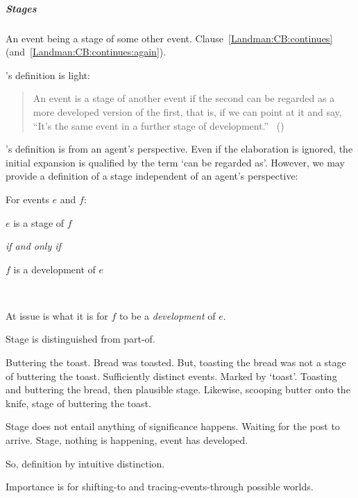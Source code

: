 \subparagraph{Stages}

\begin{note}
  An event being a stage of some other event.
  Clause~\ref{Landman:CB:continues} (and~\ref{Landman:CB:continues:again}).

  \citeauthor{Landman:1992wh}'s definition is light:
  \begin{quote}
    An event is a stage of another event if the second can be regarded as a more developed version of the first, that is, if we can point at it and say, ``It's the same event in a further stage of development.''\newline
    \mbox{ }\hfill\mbox{(\citeyear[23]{Landman:1992wh})}
  \end{quote}
  \citeauthor{Landman:1992wh}'s definition is from an agent's perspective.
  Even if the elaboration is ignored, the initial expansion is qualified by the term `can be regarded as'.
  However, we may provide a definition of a stage independent of an agent's perspective:
  \begin{definition}[Stage]
    For events \(e\) and \(f\):

    \begin{itemize*}
    \item
      \(e\) is a stage of \(f\)
    \item
      \emph{if and only if}
    \item
      \(f\) is a development of \(e\)
    \item
      \mbox{ }
    \end{itemize*}
  \end{definition}
  At issue is what it is for \(f\) to be a \emph{development} of \(e\).

  Stage is distinguished from part-of.
  \nocite{Davidson:1967aa}

  Buttering the toast.
  Bread was toasted.
  But, toasting the bread was not a stage of buttering the toast.
  Sufficiently distinct events.
  Marked by `toast'.
  Toasting and buttering the bread, then plausible stage.
  Likewise, scooping butter onto the knife, stage of buttering the toast.

  Stage does not entail anything of significance happens.
  Waiting for the post to arrive.
  Stage, nothing is happening, event has developed.

  So, definition by intuitive distinction.

  Importance is for shifting-to and tracing-events-through possible worlds.
\end{note}

